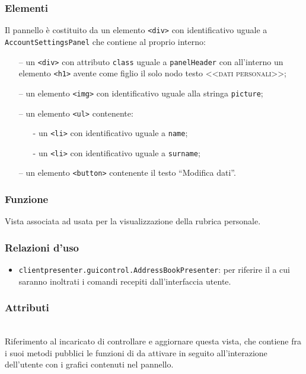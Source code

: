 \subsubsection*{Elementi}
Il pannello è costituito da un elemento \verb'<div>' con identificativo uguale a \verb'AccountSettingsPanel' che contiene al proprio interno:
\begin{itemize}
  \item[--] un \verb'<div>' con attributo \verb'class' uguale a \verb'panelHeader' con all'interno un elemento \verb'<h1>' avente come figlio il solo nodo testo \textsc{<<dati personali>>};
  \item[--] un elemento \verb'<img>' con identificativo uguale alla stringa \verb'picture';
  \item[--] un elemento \verb'<ul>' contenente:
  \begin{itemize}
    \item[-] un \verb'<li>' con identificativo uguale a \verb'name';
    \item[-] un \verb'<li>' con identificativo uguale a \verb'surname';
  \end{itemize}
  \item[--] un elemento \verb'<button>' contenente il testo ``Modifica dati''.
\end{itemize}


\subsubsection*{Funzione}
Vista associata ad  usata per la visualizzazione della rubrica personale.

\subsubsection*{Relazioni d'uso}
\begin{itemize}
  \item \texttt{clientpresenter.guicontrol.AddressBookPresenter}: per riferire il  a cui saranno inoltrati i comandi recepiti dall'interfaccia utente.
\end{itemize}

\subsubsection*{Attributi}
\begin{description}
\item{}\\
Riferimento al  incaricato di controllare e aggiornare questa vista, che contiene fra i suoi metodi pubblici le funzioni di  da attivare in seguito all'interazione dell'utente con i  grafici contenuti nel pannello.
\end{description}

